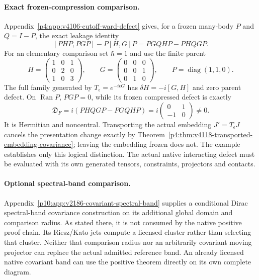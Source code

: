 \documentclass[12pt,a4paper]{article}
\begin{document}
\paragraph{Exact frozen-compression comparison.}
Appendix~\ref{p4:app:v4106-cutoff-ward-defect} gives, for a frozen
many-body $P$ and $Q=I-P$, the exact leakage identity
\[
 [PHP,PGP]-P[H,G]P=PGQHP-PHQGP.
\]
For an elementary comparison set $\hbar=1$ and use the finite parent
\[
 H=\begin{pmatrix}1&0&1\\0&2&0\\1&0&3\end{pmatrix},\qquad
 G=\begin{pmatrix}0&0&0\\0&0&1\\0&1&0\end{pmatrix},\qquad
 P=\operatorname{diag}(1,1,0).
\]
The full family generated by $T_\epsilon=e^{-i\epsilon G}$ has
$\delta H=-i[G,H]$ and zero parent defect. On $\operatorname{Ran}P$,
$PGP=0$, while its frozen compressed defect is exactly
\[
 \mathfrak D_F=i(PHQGP-PGQHP)
       =i\begin{pmatrix}0&1\\-1&0\end{pmatrix}\ne0.
\]
It is Hermitian and noncentral. Transporting the actual embedding
$J'=T_\epsilon J$ cancels the presentation change exactly by
Theorem~\ref{p4:thm:v4118-transported-embedding-covariance}; leaving the
embedding frozen does not. The example establishes only this logical
distinction. The actual native interacting defect must be evaluated
with its own generated tensors, constraints, projectors and contacts.

\paragraph{Optional spectral-band comparison.}
Appendix~\ref{p10:app:v2186-covariant-spectral-band} supplies a conditional
Dirac spectral-band covariance construction on its additional global
domain and comparison radius. As stated there, it is not consumed by
the native positive proof chain. Its Riesz/Kato jets compute a licensed
cluster rather than selecting that cluster. Neither that comparison
radius nor an arbitrarily covariant moving projector can replace the
actual admitted reference band. An already licensed native covariant
band can use the positive theorem directly on its own complete diagram.
\end{document}
